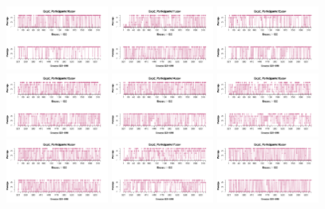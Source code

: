 \begin{figure}[th]
\includegraphics[width=0.30\textwidth]{Figures/Rating_Exp2_P10} \includegraphics[width=0.30\textwidth]{Figures/Rating_Exp2_P11} \includegraphics[width=0.30\textwidth]{Figures/Rating_Exp2_P12}
\includegraphics[width=0.30\textwidth]{Figures/Rating_Exp2_P13} \includegraphics[width=0.30\textwidth]{Figures/Rating_Exp2_P14} \includegraphics[width=0.30\textwidth]{Figures/Rating_Exp2_P15}
\includegraphics[width=0.30\textwidth]{Figures/Rating_Exp2_P16} \includegraphics[width=0.30\textwidth]{Figures/Rating_Exp2_P17} \includegraphics[width=0.30\textwidth]{Figures/Rating_Exp2_P18}

\end{figure}

